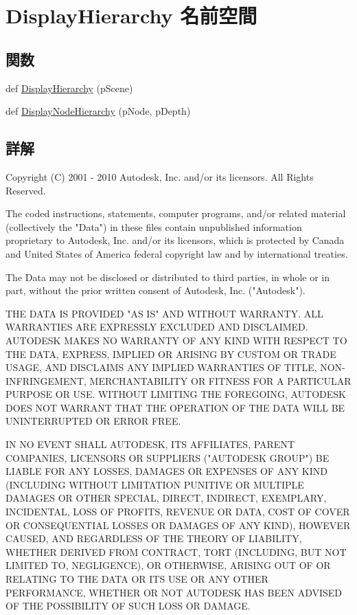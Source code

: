 \hypertarget{namespace_display_hierarchy}{}\section{Display\+Hierarchy 名前空間}
\label{namespace_display_hierarchy}
\subsection*{関数}
\begin{DoxyCompactItemize}
\item 
def \hyperlink{namespace_display_hierarchy_ae9797931e4de9a913542cb7cd726698c}{Display\+Hierarchy} (p\+Scene)
\item 
def \hyperlink{namespace_display_hierarchy_a67b11ea8107d831e4239754f35a44d91}{Display\+Node\+Hierarchy} (p\+Node, p\+Depth)
\end{DoxyCompactItemize}


\subsection{詳解}
\begin{DoxyVerb} Copyright (C) 2001 - 2010 Autodesk, Inc. and/or its licensors.
 All Rights Reserved.

 The coded instructions, statements, computer programs, and/or related material 
 (collectively the "Data") in these files contain unpublished information 
 proprietary to Autodesk, Inc. and/or its licensors, which is protected by 
 Canada and United States of America federal copyright law and by international 
 treaties. 
 
 The Data may not be disclosed or distributed to third parties, in whole or in
 part, without the prior written consent of Autodesk, Inc. ("Autodesk").

 THE DATA IS PROVIDED "AS IS" AND WITHOUT WARRANTY.
 ALL WARRANTIES ARE EXPRESSLY EXCLUDED AND DISCLAIMED. AUTODESK MAKES NO
 WARRANTY OF ANY KIND WITH RESPECT TO THE DATA, EXPRESS, IMPLIED OR ARISING
 BY CUSTOM OR TRADE USAGE, AND DISCLAIMS ANY IMPLIED WARRANTIES OF TITLE, 
 NON-INFRINGEMENT, MERCHANTABILITY OR FITNESS FOR A PARTICULAR PURPOSE OR USE. 
 WITHOUT LIMITING THE FOREGOING, AUTODESK DOES NOT WARRANT THAT THE OPERATION
 OF THE DATA WILL BE UNINTERRUPTED OR ERROR FREE. 
 
 IN NO EVENT SHALL AUTODESK, ITS AFFILIATES, PARENT COMPANIES, LICENSORS
 OR SUPPLIERS ("AUTODESK GROUP") BE LIABLE FOR ANY LOSSES, DAMAGES OR EXPENSES
 OF ANY KIND (INCLUDING WITHOUT LIMITATION PUNITIVE OR MULTIPLE DAMAGES OR OTHER
 SPECIAL, DIRECT, INDIRECT, EXEMPLARY, INCIDENTAL, LOSS OF PROFITS, REVENUE
 OR DATA, COST OF COVER OR CONSEQUENTIAL LOSSES OR DAMAGES OF ANY KIND),
 HOWEVER CAUSED, AND REGARDLESS OF THE THEORY OF LIABILITY, WHETHER DERIVED
 FROM CONTRACT, TORT (INCLUDING, BUT NOT LIMITED TO, NEGLIGENCE), OR OTHERWISE,
 ARISING OUT OF OR RELATING TO THE DATA OR ITS USE OR ANY OTHER PERFORMANCE,
 WHETHER OR NOT AUTODESK HAS BEEN ADVISED OF THE POSSIBILITY OF SUCH LOSS
 OR DAMAGE. \end{DoxyVerb}
 

